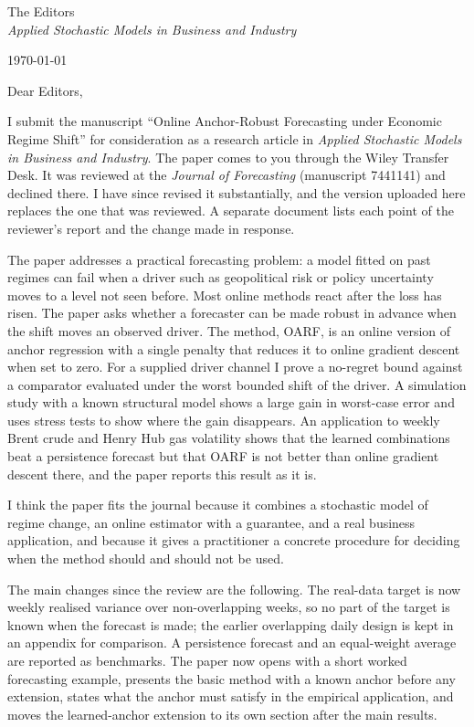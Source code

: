 \documentclass[11pt]{article}
\newcommand{\venue}{Applied Stochastic Models in Business and Industry}
\begin{document}
\thispagestyle{empty}

\noindent
The Editors\\
\textit{\venue}

\bigskip
\noindent \today

\bigskip
\noindent Dear Editors,

\noindent I submit the manuscript ``Online Anchor-Robust Forecasting under Economic
Regime Shift'' for consideration as a research article in \textit{\venue}. The paper
comes to you through the Wiley Transfer Desk. It was reviewed at the
\textit{Journal of Forecasting} (manuscript 7441141) and declined there. I have
since revised it substantially, and the version uploaded here replaces the one that
was reviewed. A separate document lists each point of the reviewer's report and the
change made in response.

The paper addresses a practical forecasting problem: a model fitted on past regimes
can fail when a driver such as geopolitical risk or policy uncertainty moves to a
level not seen before. Most online methods react after the loss has risen. The paper
asks whether a forecaster can be made robust in advance when the shift moves an
observed driver. The method, OARF, is an online version of anchor regression with a
single penalty that reduces it to online gradient descent when set to zero. For a
supplied driver channel I prove a no-regret bound against a comparator evaluated
under the worst bounded shift of the driver. A simulation study with a known
structural model shows a large gain in worst-case error and uses stress tests to
show where the gain disappears. An application to weekly Brent crude and Henry Hub
gas volatility shows that the learned combinations beat a persistence forecast but
that OARF is not better than online gradient descent there, and the paper reports
this result as it is.

I think the paper fits the journal because it combines a stochastic model of regime
change, an online estimator with a guarantee, and a real business application, and
because it gives a practitioner a concrete procedure for deciding when the method
should and should not be used.

The main changes since the review are the following. The real-data target is now
weekly realised variance over non-overlapping weeks, so no part of the target is
known when the forecast is made; the earlier overlapping daily design is kept in an
appendix for comparison. A persistence forecast and an equal-weight average are
reported as benchmarks. The paper now opens with a short worked forecasting example,
presents the basic method with a known anchor before any extension, states what the
anchor must satisfy in the empirical application, and moves the learned-anchor
extension to its own section after the main results.
\end{document}
